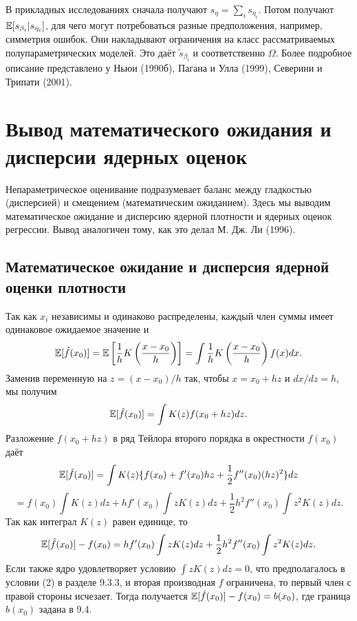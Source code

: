 В прикладных исследованиях сначала получают $s_{\eta} = \sum_i s_{\eta_i}$. Потом получают $\mathbb{E}[s_{\beta_i}| s_{\eta_i}]$, для чего могут потребоваться разные  предположения, например, симметрия ошибок. Они накладывают ограничения на класс рассматриваемых полупараметрических моделей. Это даёт $\tilde{s}_{\beta_i}$ и соответственно $\Omega$. Более подробное описание представлено у Ньюи (1990б), Пагана и Улла (1999), Северини и Трипати (2001).

\section{Вывод математического ожидания и дисперсии ядерных оценок}

Непараметрическое оценивание подразумевает баланс между гладкостью (дисперсией) и смещением (математическим ожиданием). Здесь мы выводим математическое ожидание и дисперсию ядерной плотности и ядерных оценок регрессии. Вывод аналогичен тому, как это делал М. Дж. Ли (1996).

\subsection{Математическое ожидание и дисперсия ядерной оценки плотности}

Так как $x_i$ независимы и одинаково распределены, каждый член суммы имеет одинаковое ожидаемое значение и
\[
\mathbb{E}[\hat{f}(x_0)] = \mathbb{E} \left[ \frac{1}{h} K \left( \frac{x-x_0}{h} \right) \right] = \int \frac{1}{h} K \left( \frac{x-x_0}{h} \right) f(x)dx.
\]
Заменив переменную на $z = (x - x_0)/h$ так, чтобы $x = x_0 + hz$ и $dx/dz = h$, мы получим
\[
\mathbb{E}[\hat{f}(x_0)] = \int K(z)f(x_0 + hz)dz.
\]
Разложение $f(x_0 + hz)$ в ряд Тейлора второго порядка в окрестности $f(x_0)$ даёт  
\[
\mathbb{E}[\hat{f}(x_0)] = \int K(z)\{ f(x_0) + f'(x_0)hz + \frac{1}{2}f''(x_0)(hz)^2\}dz 
\]
\[
= f(x_0) \int K(z)dz + hf'(x_0)\int zK(z)dz + \frac{1}{2} h^2f''(x_0)\int z^2K(z)dz.
\]
Так как интеграл $K(z)$ равен единице, то 
\[
\mathbb{E}[\hat{f}(x_0)] - f(x_0) = hf'(x_0) \int zK(z)dz + \frac{1}{2}h^2f''(x_0) \int z^2K(z)dz.
\]
Если также ядро удовлетворяет условию $\int zK(z)dz = 0$, что предполагалось в условии (2) в разделе 9.3.3, и вторая производная $f$ ограничена, то первый член с правой стороны исчезает. Тогда получается $\mathbb{E}[\hat{f}(x_0)] - f(x_0) = b(x_0)$, где граница $b(x_0)$ задана в 9.4.

